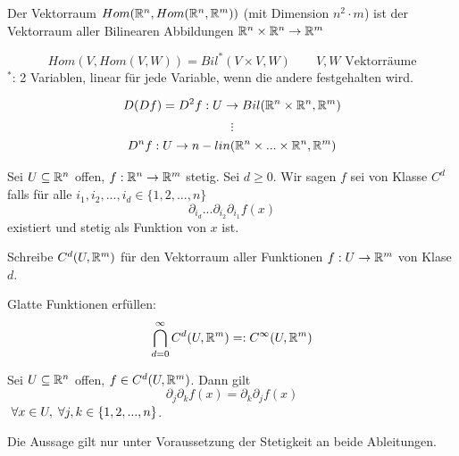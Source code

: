 \documentclass[main.tex]{subfiles}
\begin{document}
Der Vektorraum $ Hom(\mathbb{R}^n,Hom(\mathbb{R}^n,\mathbb{R}^m))$ (mit Dimension $n^2 \cdot m$) ist der Vektorraum aller Bilinearen Abbildungen $\mathbb{R}^n \times \mathbb{R}^n \to \mathbb{R}^m$

\begin{Bemerkung}[allgemein]
  $$Hom(V, Hom(V,W)) = Bil^*(V \times V, W) \qquad V,W \text{ Vektorräume}$$
  $^*$: 2 Variablen, linear für jede Variable, wenn die andere festgehalten wird.
\end{Bemerkung}

$$D(Df) = D^2f: U \to Bil(\mathbb{R}^n \times \mathbb{R}^n, \mathbb{R}^m)$$
$$\vdots$$
$$D^nf : U \to n-lin(\mathbb{R}^n\times ... \times \mathbb{R}^n,\mathbb{R}^m)$$

\begin{Definition}
  Sei $U \subseteq \mathbb{R}^n$ offen, $f:\mathbb{R}^n \to \mathbb{R}^m$ stetig. Sei $d \geq 0$. Wir sagen $f$ sei von Klasse $C^d$ falls für alle $i_1, i_2,...,i_d \in \{1,2,...,n\}$
  $$\partial_{i_d} ... \partial_{i_2} \partial_{i_1}f(x)$$
  existiert und stetig als Funktion von $x$ ist.

  Schreibe $C^d(U,\mathbb{R}^m)$ für den Vektorraum aller Funktionen $f: U \to \mathbb{R}^m$ von Klase $d$.

  Glatte Funktionen erfüllen:
  $$\bigcap_{d = 0}^\infty C^d(U,\mathbb{R}^m) =: C^\infty (U,\mathbb{R}^m)$$
\end{Definition}

\begin{Theorem}
  Sei $U \subseteq \mathbb{R}^n$ offen, $f \in C^d(U, \mathbb{R}^m)$. Dann gilt
  $$\partial_j \partial_k f(x) = \partial_k \partial_j f(x)$$
  $\;\forall x \in U, \;\forall j,k \in \{1,2,...,n\}$.
\end{Theorem}

\begin{Bemerkung}
  Die Aussage gilt nur unter Voraussetzung der Stetigkeit an beide Ableitungen.
\end{Bemerkung}
\end{document}
